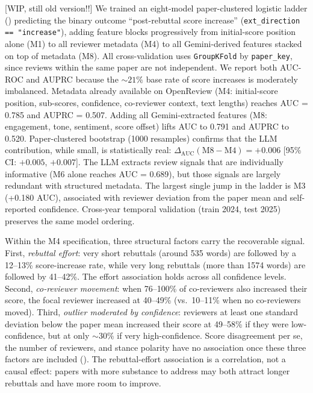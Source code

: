 \documentclass{article}
\newcommand{\code}[1]{\texttt{#1}}
\begin{document}
[WIP, still old version!!] We trained an eight-model paper-clustered logistic ladder () predicting the binary outcome ``post-rebuttal score increase'' (\code{ext\_direction == "increase"}), adding feature blocks progressively from initial-score position alone (M1) to all reviewer metadata (M4) to all Gemini-derived features stacked on top of metadata (M8). All cross-validation uses \texttt{GroupKFold} by \code{paper\_key}, since reviews within the same paper are not independent. We report both AUC-ROC and AUPRC because the ${\sim}21\%$ base rate of score increases is moderately imbalanced. Metadata already available on OpenReview (M4: initial-score position, sub-scores, confidence, co-reviewer context, text lengths) reaches AUC = 0.785 and AUPRC = 0.507. Adding all Gemini-extracted features (M8: engagement, tone, sentiment, score offset) lifts AUC to 0.791 and AUPRC to 0.520. Paper-clustered bootstrap (1000 resamples) confirms that the LLM contribution, while small, is statistically real: $\Delta_{\text{AUC}}(\text{M8} - \text{M4}) = +0.006$ [95\% CI: $+0.005$, $+0.007$]. The LLM extracts review signals that are individually informative (M6 alone reaches AUC = 0.689), but those signals are largely redundant with structured metadata. The largest single jump in the ladder is M3 (+0.180 AUC), associated with reviewer deviation from the paper mean and self-reported confidence. Cross-year temporal validation (train 2024, test 2025) preserves the same model ordering.

Within the M4 specification, three structural factors carry the recoverable signal. First, \emph{rebuttal effort}: very short rebuttals (around 535 words) are followed by a 12--13\% score-increase rate, while very long rebuttals (more than \num{1574} words) are followed by 41--42\%. The effort association holds across all confidence levels. Second, \emph{co-reviewer movement}: when 76--100\% of co-reviewers also increased their score, the focal reviewer increased at 40--49\% (vs.\ 10--11\% when no co-reviewers moved). Third, \emph{outlier moderated by confidence}: reviewers at least one standard deviation below the paper mean increased their score at 49--58\% if they were low-confidence, but at only ${\sim}30\%$ if very high-confidence. Score disagreement per se, the number of reviewers, and stance polarity have no association once these three factors are included (). The rebuttal-effort association is a correlation, not a causal effect: papers with more substance to address may both attract longer rebuttals and have more room to improve.
\end{document}

